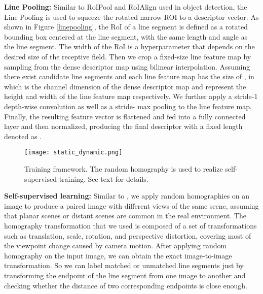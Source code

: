 \documentclass[10pt,twocolumn,letterpaper]{article}
\begin{document}
\textbf{Line Pooling:} Similar to RoIPool\cite{roipool} and RoIAlign\cite{roialign} used in object detection, the Line Pooling is used to squeeze the rotated narrow ROI to a descriptor vector. As shown in Figure \ref{linepooling}, the RoI of a line segment is defined as a rotated bounding box centered at the line segment, with the same length and angle as the line segment. The width of the RoI is a hyperparameter that depends on the desired size of the receptive field. Then we crop a fixed-size line feature map by sampling from the dense descriptor map using bilinear interpolation. Assuming there exist  candidate line segments and each line feature map has the size of , in which  is the channel dimension of the dense descriptor map and  represent the height and width of the line feature map respectively. We further apply a  stride-1 depth-wise convolution as well as a stride- max pooling to the line feature map. Finally, the resulting feature vector is flattened and fed into a fully connected layer and then normalized, producing the final descriptor with a fixed length denoted as . 



\begin{figure}[]
\begin{center}
\centering
\texttt{[image: static\_dynamic.png]}
\end{center}
 \caption{Training framework. The random homography is used to realize self-supervised training. See text for details.}
    \label{training_fig}
\end{figure}


\textbf{Self-supervised learning:} Similar to \cite{superpoint}, we apply random homographies on an image to produce a paired image with different views of the same scene, assuming that planar scenes or distant scenes are common in the real environment. The homography transformation that we used is composed of a set of transformations such as translation, scale, rotation, and perspective distortion, covering most of the viewpoint change caused by camera motion. After applying random homography on the input image, we can obtain the exact image-to-image transformation. So we can label matched or unmatched line segments just by transforming the endpoint of the line segment from one image to another and checking whether the distance of two corresponding endpoints is close enough.\label{static_and_dynamic}
\end{document}
